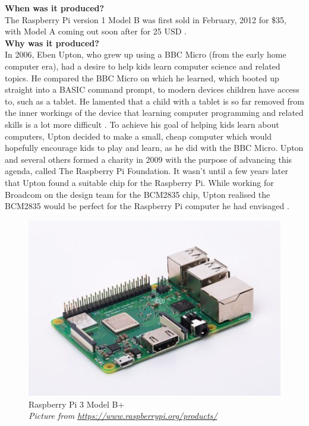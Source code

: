 \textbf{When was it produced?}\\
The Raspberry Pi version 1 Model B was first sold in February, 2012 for \$35, with Model A coming out soon after for 25 USD 
\cite{RN100}.\\

\textbf{Why was it produced?}\\
In 2006, Eben Upton, who grew up using a BBC Micro (from the early home computer era), had a desire to help kids learn computer science and related topics. He compared the BBC Micro on which he learned, which booted up straight into a BASIC command prompt, to modern devices children have access to, such as a tablet. He lamented that a child with a tablet is so far removed from the inner workings of the device that learning computer programming and related skills is a lot more difficult 
\cite{RN97}. To achieve his goal of helping kids learn about computers, Upton decided to make a small, cheap computer which would hopefully encourage kids to play and learn, as he did with the BBC Micro. Upton and several others formed a charity in 2009 with the purpose of advancing this agenda, called The Raspberry Pi Foundation. It wasn't until a few years later that Upton found a suitable chip for the Raspberry Pi. While working for Broadcom on the design team for the BCM2835 chip, Upton realised the BCM2835 would be perfect for the Raspberry Pi computer he had envisaged
\cite{RN97}.\\

\begin{figure} \begin{center}
\includegraphics[width=.3\linewidth]{pics/Raspberry_Pi_3B+} 
\end{center} 
\caption{Raspberry Pi 3 Model B+\\ \textit{\small{Picture from \url{https://www.raspberrypi.org/products/}}}}
\label{Raspberry_Pi}
\end{figure} 

